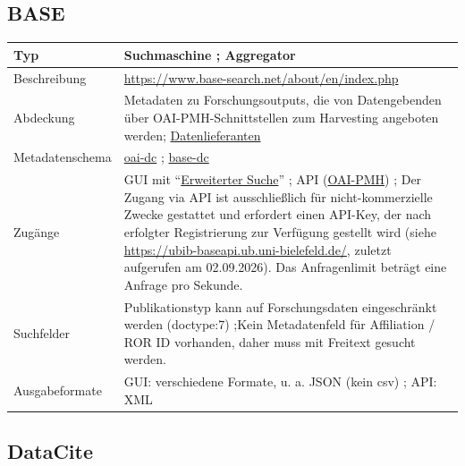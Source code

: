 \documentclass[
  ngerman,
  letterpaper,
  DIV=11]{scrreprt}
\newcounter{none} %
\begin{document}
\subsection{BASE}\label{base}

{\def\LTcaptype{none} %
\begin{longtable}[]{@{}
  >{\raggedright\arraybackslash}p{}
  >{\raggedright\arraybackslash}p{}@{}}
\toprule\noalign{}
\begin{minipage}[b]{\linewidth}\raggedright
Typ
\end{minipage} & \begin{minipage}[b]{\linewidth}\raggedright
Suchmaschine ; Aggregator
\end{minipage} \\
\midrule\noalign{}
\endhead
\bottomrule\noalign{}
\endlastfoot
Beschreibung & \url{https://www.base-search.net/about/en/index.php} \\
Abdeckung & Metadaten zu Forschungsoutputs, die von Datengebenden über
OAI-PMH-Schnittstellen zum Harvesting angeboten werden;
\href{https://www.base-search.net/about/de/about_sources_date.php}{Datenlieferanten} \\
Metadatenschema & \href{https://oai.base-search.net/\#oai-dc}{oai-dc} ;
\href{https://oai.base-search.net/\#base-dc}{base-dc} \\
Zugänge & GUI mit
``\href{https://www.base-search.net/Search/Advanced}{Erweiterter
Suche}'' ; API (\href{https://oai.base-search.net/}{OAI-PMH}) ; Der
Zugang via API ist ausschließlich für nicht-kommerzielle Zwecke
gestattet und erfordert einen API-Key, der nach erfolgter Registrierung
zur Verfügung gestellt wird (siehe
\url{https://ubib-baseapi.ub.uni-bielefeld.de/}, zuletzt aufgerufen am
02.09.2026). Das Anfragenlimit beträgt eine Anfrage pro Sekunde. \\
Suchfelder & Publikationstyp kann auf Forschungsdaten eingeschränkt
werden (doctype:7) ;Kein Metadatenfeld für Affiliation / ROR ID
vorhanden, daher muss mit Freitext gesucht werden. \\
Ausgabeformate & GUI: verschiedene Formate, u. a. JSON (kein csv) ; API:
XML \\
\end{longtable}
}

\subsection{DataCite}\label{datacite}
\end{document}

